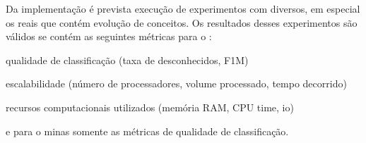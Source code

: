 
Da implementação \mfog é prevista execução de experimentos com \datasets
diversos, em especial os \datasets reais que contém evolução de conceitos.
Os resultados desses experimentos são válidos se contém as seguintes métricas
para o \mfog:
\begin{enumerate*}
    \item qualidade de classificação (taxa de desconhecidos, F1M)
    \item escalabilidade (número de processadores, volume processado, tempo decorrido)
    \item recursos computacionais utilizados (memória RAM, CPU time, io)
\end{enumerate*}
e para o minas somente as métricas de qualidade de classificação.






